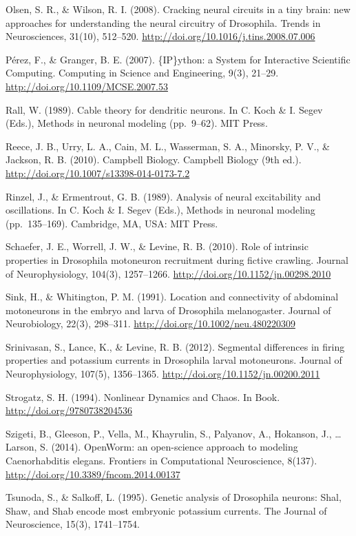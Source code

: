 \documentclass[12pt,a4paper,]{report}
\begin{document}
Olsen, S. R., \& Wilson, R. I. (2008). Cracking neural circuits in a
tiny brain: new approaches for understanding the neural circuitry of
Drosophila. Trends in Neurosciences, 31(10), 512--520.
\url{http://doi.org/10.1016/j.tins.2008.07.006}

Pérez, F., \& Granger, B. E. (2007). \{IP\}ython: a System for
Interactive Scientific Computing. Computing in Science and Engineering,
9(3), 21--29. \url{http://doi.org/10.1109/MCSE.2007.53}

Rall, W. (1989). Cable theory for dendritic neurons. In C. Koch \& I.
Segev (Eds.), Methods in neuronal modeling (pp.~9--62). MIT Press.

Reece, J. B., Urry, L. A., Cain, M. L., Wasserman, S. A., Minorsky, P.
V., \& Jackson, R. B. (2010). Campbell Biology. Campbell Biology (9th
ed.). \url{http://doi.org/10.1007/s13398-014-0173-7.2}

Rinzel, J., \& Ermentrout, G. B. (1989). Analysis of neural excitability
and oscillations. In C. Koch \& I. Segev (Eds.), Methods in neuronal
modeling (pp.~135--169). Cambridge, MA, USA: MIT Press.

Schaefer, J. E., Worrell, J. W., \& Levine, R. B. (2010). Role of
intrinsic properties in Drosophila motoneuron recruitment during fictive
crawling. Journal of Neurophysiology, 104(3), 1257--1266.
\url{http://doi.org/10.1152/jn.00298.2010}

Sink, H., \& Whitington, P. M. (1991). Location and connectivity of
abdominal motoneurons in the embryo and larva of Drosophila
melanogaster. Journal of Neurobiology, 22(3), 298--311.
\url{http://doi.org/10.1002/neu.480220309}

Srinivasan, S., Lance, K., \& Levine, R. B. (2012). Segmental
differences in firing properties and potassium currents in Drosophila
larval motoneurons. Journal of Neurophysiology, 107(5), 1356--1365.
\url{http://doi.org/10.1152/jn.00200.2011}

Strogatz, S. H. (1994). Nonlinear Dynamics and Chaos. In Book.
\url{http://doi.org/9780738204536}

Szigeti, B., Gleeson, P., Vella, M., Khayrulin, S., Palyanov, A.,
Hokanson, J., \ldots{} Larson, S. (2014). OpenWorm: an open-science
approach to modeling Caenorhabditis elegans. Frontiers in Computational
Neuroscience, 8(137). \url{http://doi.org/10.3389/fncom.2014.00137}

Tsunoda, S., \& Salkoff, L. (1995). Genetic analysis of Drosophila
neurons: Shal, Shaw, and Shab encode most embryonic potassium currents.
The Journal of Neuroscience, 15(3), 1741--1754.
\end{document}
